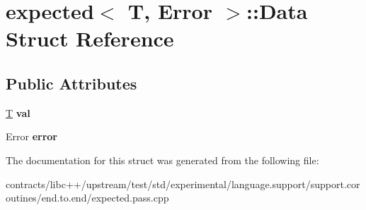 \hypertarget{structexpected_1_1_data}{}\section{expected$<$ T, Error $>$\+:\+:Data Struct Reference}
\label{structexpected_1_1_data}
\subsection*{Public Attributes}
\begin{DoxyCompactItemize}
\item 
\mbox{\label{structexpected_1_1_data_a5043ed9aef54ffcbbe3817d89efe48c4}} 
\mbox{\hyperlink{struct_t}{T}} {\bfseries val}
\item 
\mbox{\label{structexpected_1_1_data_a6df55ee218f26e89d2f04ca61bb2d1c7}} 
Error {\bfseries error}
\end{DoxyCompactItemize}


The documentation for this struct was generated from the following file\+:\begin{DoxyCompactItemize}
\item 
contracts/libc++/upstream/test/std/experimental/language.\+support/support.\+coroutines/end.\+to.\+end/expected.\+pass.\+cpp\end{DoxyCompactItemize}
